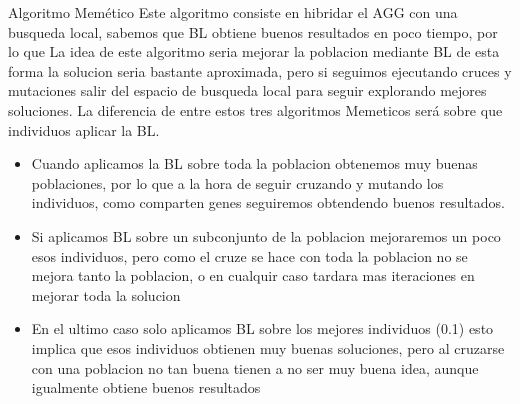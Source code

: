 Algoritmo Memético
Este algoritmo consiste en hibridar el AGG con una busqueda local, sabemos que  BL obtiene buenos resultados en poco tiempo, por lo que La
idea de este algoritmo seria mejorar la poblacion mediante BL de esta forma la solucion seria bastante aproximada, pero si seguimos ejecutando cruces y mutaciones
salir del espacio de busqueda local para seguir explorando mejores soluciones.
La diferencia de entre estos tres algoritmos Memeticos será sobre que individuos aplicar la BL.
\begin{itemize}
  \item Cuando aplicamos la BL sobre toda la poblacion obtenemos muy buenas poblaciones, por lo que a la hora de seguir cruzando y mutando los individuos, como comparten genes seguiremos obtendendo buenos resultados. 
  \item Si aplicamos BL sobre un subconjunto de la poblacion mejoraremos un poco esos individuos, pero como el cruze se hace con toda la poblacion no se mejora tanto la poblacion, o en cualquir caso tardara mas iteraciones en mejorar toda la solucion
  \item En el ultimo caso solo aplicamos BL sobre los mejores individuos (0.1) esto implica que esos individuos obtienen muy buenas soluciones, pero al cruzarse con una poblacion no tan buena tienen a no ser muy buena idea, aunque igualmente obtiene buenos resultados

\end{itemize}

